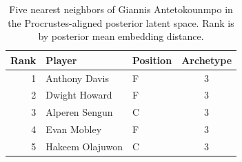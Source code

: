 \begin{table}[htbp]
  \centering\small
  \begin{tabular}{rllc}
    \toprule
    Rank & Player & Position & Archetype \\
    \midrule
    1 & Anthony Davis & F & 3 \\
    2 & Dwight Howard & F & 3 \\
    3 & Alperen Sengun & C & 3 \\
    4 & Evan Mobley & F & 3 \\
    5 & Hakeem Olajuwon & C & 3 \\
    \bottomrule
  \end{tabular}
  \caption{Five nearest neighbors of Giannis Antetokounmpo in the Procrustes-aligned posterior latent space. Rank is by posterior mean embedding distance.}
  \label{tab:Giannis_Antetokounmpo_neighbors}
\end{table}

